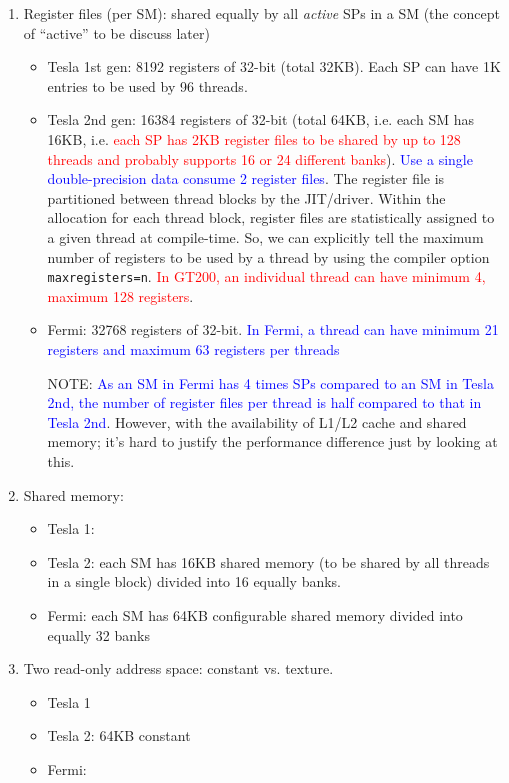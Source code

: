 \begin{enumerate}
\item Register files (per SM): shared equally by all {\it active} SPs
  in a SM (the concept of ``active'' to be discuss later)
  \begin{itemize}
  \item Tesla 1st gen:  8192 registers of 32-bit (total 32KB). Each
    SP can have 1K entries to be used by 96 threads.

  \item Tesla 2nd gen: 16384 registers of 32-bit (total 64KB,
    i.e. each SM has 16KB, i.e.
    \textcolor{red}{each SP has 2KB register files to be shared by up
      to 128 threads and probably supports 16 or 24 different banks}).
    \textcolor{blue}{Use a single double-precision data consume 2
      register files}.
    The register file is partitioned between thread blocks by the
    JIT/driver. Within the allocation for each thread block, register
    files are statistically assigned to a given thread at
    compile-time. So, we can explicitly tell the maximum number of
    registers to be used by a thread by using the compiler option
    \verb!maxregisters=n!.
    \textcolor{red}{In GT200, an individual thread can have minimum 4,
      maximum 128 registers}.

  \item Fermi: 32768 registers of 32-bit.
    \textcolor{blue}{In Fermi, a thread can have minimum 21 registers
      and maximum 63 registers per threads}

    NOTE:
    \textcolor{blue}{As an SM in Fermi has 4 times SPs compared to an
      SM in Tesla 2nd, the number of register files per thread is half
      compared to that in Tesla 2nd}.
    However, with the availability of L1/L2 cache and shared memory;
    it's hard to justify the performance difference just by looking at
    this.
  \end{itemize}

\item Shared memory:
  \begin{itemize}
  \item Tesla 1: 
  \item Tesla 2: each SM has 16KB shared memory (to be shared by all
    threads in a single block) divided into 16 equally banks. 
  \item Fermi: each SM has 64KB configurable shared memory divided
    into equally 32 banks
  \end{itemize}

\item Two read-only address space: constant vs. texture. 
  \begin{itemize}
  \item Tesla 1
  \item Tesla 2: 64KB constant
  \item Fermi: 
  \end{itemize}


\end{enumerate}
